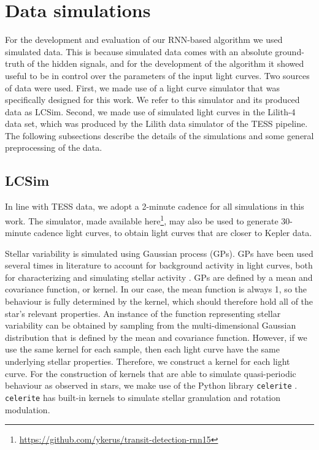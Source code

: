 
\section{Data simulations}

For the development and evaluation of our RNN-based algorithm we used simulated data. This is because simulated data comes with an absolute ground-truth of the hidden signals, and for the development of the algorithm it showed useful to be in control over the parameters of the input light curves. Two sources of data were used. First, we made use of a light curve simulator that was specifically designed for this work. We refer to this simulator and its produced data as LCSim. Second, we made use of simulated light curves in the Lilith-4 data set, which was produced by the Lilith data simulator of the TESS pipeline. The following subsections describe the details of the simulations and some general preprocessing of the data.

\subsection{LCSim}
\label{sec:lcsim}

In line with TESS data, we adopt a 2-minute cadence for all simulations in this work. The simulator, made available here\footnote{\url{https://github.com/ykerus/transit-detection-rnn15}}, may also be used to generate 30-minute cadence light curves, to obtain light curves that are closer to Kepler data. 

Stellar variability is simulated using Gaussian process (GPs). GPs have been used several times in literature to account for background activity in light curves, both for characterizing and simulating stellar activity \citep{barros2020improving, zucker2018shallow}. GPs are defined by a mean and covariance function, or kernel. In our case, the mean function is always 1, so the behaviour is fully determined by the kernel, which should therefore hold all of the star's relevant properties. An instance of the function representing stellar variability can be obtained by sampling from the multi-dimensional Gaussian distribution that is defined by the mean and covariance function. However, if we use the same kernel for each sample, then each light curve have the same underlying stellar properties. Therefore, we construct a kernel for each light curve. For the construction of kernels that are able to simulate quasi-periodic behaviour as observed in stars, we make use of the Python library \texttt{celerite} \citep{foreman2017fast}. \texttt{celerite} has built-in kernels to simulate stellar granulation and rotation modulation. 

